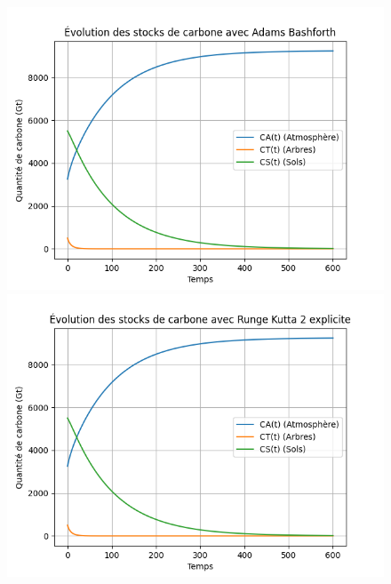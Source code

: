 \documentclass[12pt]{article}
\theoremstyle{saav}
\begin{document}
	
	

	\begin{figure}[htbp]
		\centering
		\begin{minipage}{0.48\textwidth}
			\centering
			\includegraphics[width=\linewidth]{images/Adams_Bashforth.png}

		\end{minipage}%
		\hfill
		\begin{minipage}{0.48\textwidth}
			\centering
			\includegraphics[width=\linewidth]{images/Runge_Kutta_2.png}

		\end{minipage}
		
		\vspace{0.5cm}
		

\end{figure}
\end{document}
